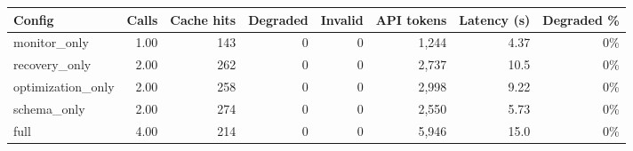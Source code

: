 \begin{tabular}{lrrrrrrr}
\toprule
Config & Calls & Cache hits & Degraded & Invalid & API tokens & Latency (s) & Degraded \% \\
\midrule
monitor\_only & 1.00 & 143 & 0 & 0 & 1{,}244 & 4.37 & 0\% \\
recovery\_only & 2.00 & 262 & 0 & 0 & 2{,}737 & 10.5 & 0\% \\
optimization\_only & 2.00 & 258 & 0 & 0 & 2{,}998 & 9.22 & 0\% \\
schema\_only & 2.00 & 274 & 0 & 0 & 2{,}550 & 5.73 & 0\% \\
full & 4.00 & 214 & 0 & 0 & 5{,}946 & 15.0 & 0\% \\
\bottomrule
\end{tabular}
